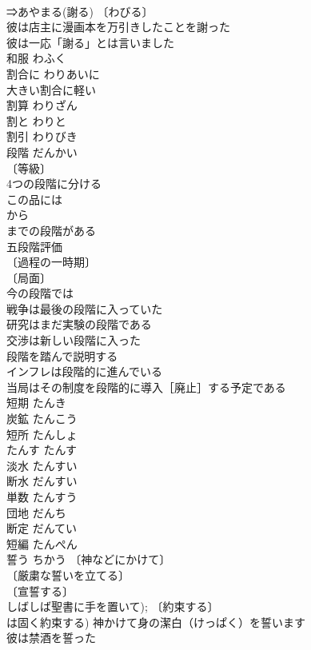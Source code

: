\documentclass[8pt]{extreport}
\begin{document}
\begin{CJK}{UTF8}{min}
\\	⇒あやまる(謝る) 〔わびる〕
\\	彼は店主に漫画本を万引きしたことを謝った 
\\	彼は一応「謝る」とは言いました 
\\	和服	わふく	
\\	割合に	わりあいに	
\\	大きい割合に軽い 
\\	割算	わりざん	
\\	割と	わりと	
\\	割引	わりびき	
\\	段階	だんかい	
\\	〔等級〕
\\	4つの段階に分ける 
\\	この品には
\\	から
\\	までの段階がある 
\\	五段階評価 
\\	〔過程の一時期〕
\\	〔局面〕
\\	今の段階では 
\\	戦争は最後の段階に入っていた 
\\	研究はまだ実験の段階である 
\\	交渉は新しい段階に入った 
\\	段階を踏んで説明する 
\\	インフレは段階的に進んでいる 
\\	当局はその制度を段階的に導入［廃止］する予定である 
\\	短期	たんき	
\\	炭鉱	たんこう	
\\	短所	たんしょ	
\\	たんす	たんす	
\\	淡水	たんすい	
\\	断水	だんすい	
\\	単数	たんすう	
\\	団地	だんち	
\\	断定	だんてい	
\\	短編	たんぺん	
\\	誓う	ちかう	〔神などにかけて〕
\\	〔厳粛な誓いを立てる〕
\\	〔宣誓する〕
\\	しばしば聖書に手を置いて); 〔約束する〕
\\	は固く約束する) 神かけて身の潔白（けっぱく）を誓います 
\\	彼は禁酒を誓った 

\end{CJK}
\end{document}
